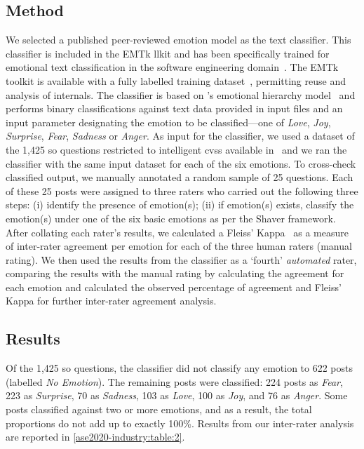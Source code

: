\subsection{Method}
\label{ase2020-industry:sec:study:method}
We selected a published peer-reviewed emotion model as the text classifier. This classifier is included in the EMTk llkit and has been specifically trained for emotional text classification in the software engineering domain~\citep{calefato2017}. The EMTk toolkit is available with a fully labelled training dataset~\citep{novielli2018}, permitting reuse and analysis of internals.  The classifier is based on \citeauthor{shaver1987}'s emotional hierarchy model~\citep{shaver1987} and performs binary classifications against text data provided in input files and an input parameter designating the emotion to be classified---one of \textit{Love}, \textit{Joy}, \textit{Surprise}, \textit{Fear}, \textit{Sadness} or \textit{Anger}. As input for the classifier, we used a dataset of the 1,425 \gls{so} questions restricted to intelligent \glspl{cvs} available in~\citep{Cummaudo:2020icse} and we ran the classifier with the same input dataset for each of the six emotions.
To cross-check classified output, we manually annotated a random sample of 25 questions.  Each of these 25 posts were assigned to three raters who carried out the following three steps: (i) identify the presence of emotion(s); (ii) if emotion(s) exists, classify the emotion(s) under one of the six basic emotions as per the Shaver framework. After collating each rater's results, we calculated a Fleiss' Kappa~\citep{Fleiss:1971ff} as a measure of inter-rater agreement per emotion for each of the three human raters (manual rating). We then used the results from the classifier as a `fourth' \textit{automated} rater, comparing the results with the manual rating by calculating the agreement for each emotion and calculated the observed percentage of agreement and Fleiss' Kappa for further inter-rater agreement analysis.

\subsection{Results} \label{ase2020-industry:SubSection:Findings}

Of the 1,425 \gls{so} questions, the classifier did not classify any emotion to 622 posts (labelled \textit{No Emotion}). The remaining posts were classified: 224 posts as \textit{Fear}, 223 as \textit{Surprise}, 70 as \textit{Sadness}, 103 as \textit{Love}, 100 as \textit{Joy}, and 76 as \textit{Anger}. Some posts classified against two or more emotions, and as a result, the total proportions do not add up to exactly 100\%. 
Results from our inter-rater analysis are reported in \cref{ase2020-industry:table:2}.

